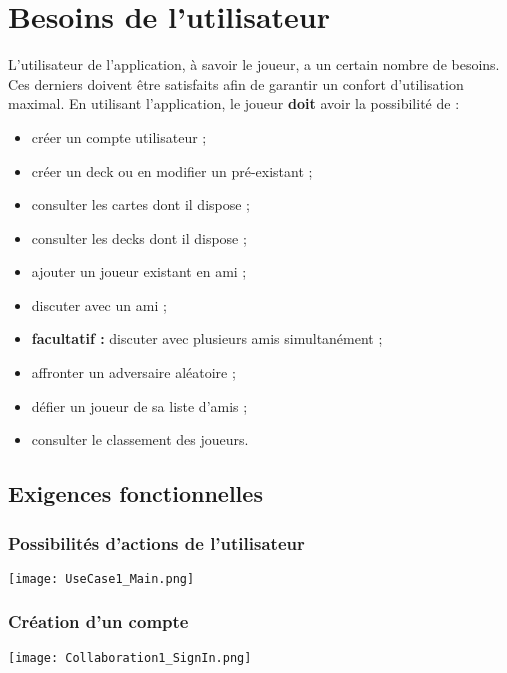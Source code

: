 \documentclass{article}
\begin{document}
\section{Besoins de l'utilisateur}
    L'utilisateur de l'application, à savoir le joueur, a un certain nombre de besoins. Ces derniers doivent être satisfaits afin de garantir un confort d'utilisation
    maximal. En utilisant l'application, le joueur \textbf{doit} avoir la possibilité de :

    \begin{itemize}
        \item créer un compte utilisateur ;
        \item créer un \gls{deck} ou en modifier un pré-existant ;
        \item consulter les cartes dont il dispose ;
        \item consulter les \glspl{deck} dont il dispose ;
        \item ajouter un joueur existant en ami ;
        \item discuter avec un ami ;
        \item \textbf{\gls{facultatif} :} discuter avec plusieurs amis simultanément ;
        \item affronter un adversaire aléatoire ;
        \item défier un joueur de sa liste d'amis ;
        \item consulter le classement des joueurs.
    \end{itemize}

    \subsection{Exigences fonctionnelles}
        \subsubsection{Possibilités d'actions de l'utilisateur}
            \begin{center}\texttt{[image: UseCase1\_Main.png]}\end{center}

        \subsubsection{Création d'un compte}
            \begin{center}\texttt{[image: Collaboration1\_SignIn.png]}\end{center}
\end{document}
